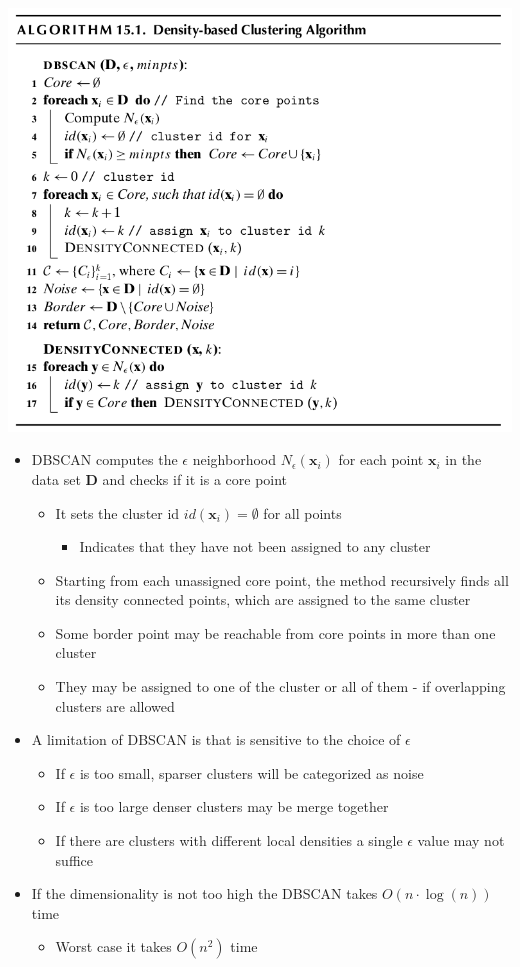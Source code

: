 \documentclass[11pt]{article}
\begin{document}
\begin{center}
\includegraphics[width=.9\linewidth]{The Dbscan Algorithm/screenshot_2018-11-27_21-50-17.png}
\end{center}
\begin{itemize}
\item DBSCAN computes the \(\epsilon\) neighborhood \(N_\epsilon(\pmb x_i)\) for each point \(\pmb x_i\) in the data set \(\mathbf D\) and checks if it is a core point
\begin{itemize}
\item It sets the cluster id \(id(\pmb x_i) = \emptyset\) for all points
\begin{itemize}
\item Indicates that they have not been assigned to any cluster
\end{itemize}
\item Starting from each unassigned core point, the method recursively finds all its density connected points, which are assigned to the same cluster
\item Some border point may be reachable from core points in more than one cluster
\item They may be assigned to one of the cluster or all of them - if overlapping clusters are allowed
\end{itemize}

\item A limitation of DBSCAN is that is sensitive to the choice of \(\epsilon\)
\begin{itemize}
\item If \(\epsilon\) is too small, sparser clusters will be categorized as noise
\item If \(\epsilon\) is too large denser clusters may be merge together
\item If there are clusters with different local densities a single \(\epsilon\) value may not suffice
\end{itemize}

\item If the dimensionality is not too high the DBSCAN takes \(O(n \cdot \log(n))\) time
\begin{itemize}
\item Worst case it takes \(O(n^2)\) time
\end{itemize}
\end{itemize}
\end{document}

